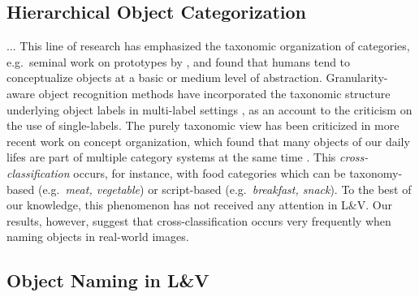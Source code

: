 \documentclass[10pt, a4paper]{article}
\newcommand{\refexp}[1]{\textsl{#1}}
\begin{document}
\subsection{Hierarchical Object Categorization} 
... This line of research has emphasized the taxonomic organization of categories, e.g.\ seminal work on prototypes by ,  and found that humans tend to conceptualize objects at a basic or medium level of abstraction.
Granularity-aware object recognition methods have incorporated the taxonomic structure underlying object labels in multi-label settings \cite{deng2014large,wang2014poodle,peterson2018learning}, as an account to the criticism on the use of single-labels. 
The purely taxonomic view has been criticized in more recent work on concept organization, which found that many objects of our daily lifes are part of multiple category systems at the same time \cite{ross1999food,SHAFTO20111}. 
This \textit{cross-classification} occurs, for instance, with food categories which can be taxonomy-based (e.g.\  \refexp{meat, vegetable}) or script-based (e.g.\  \refexp{breakfast, snack}).
To the best of our knowledge, this phenomenon has not received any attention in L\&V.
Our results, however, suggest that cross-classification occurs very frequently when naming objects in real-world images.


\subsection{Object Naming in L\&V} 
\end{document}
